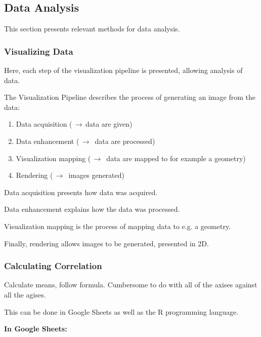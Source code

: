 \subsection{Data Analysis} 

This section presents relevant methods for data analysis.

\subsubsection{Visualizing Data}

Here, each step of the visualization pipeline is presented, allowing analysis of data.

The Visualization Pipeline describes the process of generating an image from the data: \citep{timo-ropinski-liu}

\begin{enumerate}
\item Data acquisition ($\,\to\,$data are given)
\item Data enhancement ($\,\to\,$ data are processed)
\item Visualization mapping ($\,\to\,$ data are mapped to for example a geometry)
\item Rendering ($\,\to\,$ images generated)
\end{enumerate}


Data acquisition presents how data was acquired.

Data enhancement explains how the data was processed.

Visualization mapping is the process of mapping data to e.g. a geometry.

Finally, rendering allows images to be generated, presented in 2D.

\subsubsection{Calculating Correlation}

Calculate means, follow formula. Cumbersome to do with all of the axises against all the agises.

This can be done in Google Sheets as well as the R programming language.

\textbf{In Google Sheets: }

